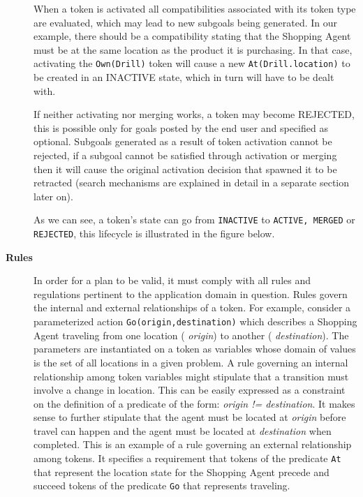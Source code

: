 \begin{description}
When a token is activated all compatibilities associated with its
token type are evaluated, which may lead to new subgoals being
generated. In our example, there should be a compatibility stating
that the Shopping Agent must be at the same location as the product it
is purchasing. In that case, activating the \texttt{Own(Drill)} token
will cause a new \texttt{At(Drill.location)} to be created in an
INACTIVE state, which in turn will have to be dealt with.


If neither activating nor merging works, a token may become REJECTED,
this is possible only for goals posted by the end user and specified
as optional. Subgoals generated as a result of token activation cannot
be rejected, if a subgoal cannot be satisfied through activation or
merging then it will cause the original activation decision that
spawned it to be retracted (\eus search mechanisms are explained in
detail in a separate section later on).

As we can see, a token's state can go from \texttt{INACTIVE} to
\texttt{ACTIVE, MERGED} or \texttt{REJECTED}, this lifecycle is
illustrated in the figure below.


\item[\textbf{Rules}] In order for a plan to be valid, it must comply
  with all rules and regulations pertinent to the application domain
  in question. Rules govern the internal and external relationships of
  a token. For example, consider a parameterized action
  \texttt{Go(origin,destination)} which describes a Shopping Agent
  traveling from one location ( \textit{origin}) to another (
  \textit{destination}). The parameters are instantiated on a token as
  variables whose domain of values is the set of all locations in a
  given problem. A rule governing an internal relationship among token
  variables might stipulate that a transition must involve a change in
  location. This can be easily expressed as a constraint on the
  definition of a predicate of the form: \textit{origin !=
    destination}. It makes sense to further stipulate that the agent
  must be located at \textit{origin} before travel can happen and the
  agent must be located at \textit{destination} when completed. This
  is an example of a rule governing an external relationship among
  tokens. It specifies a requirement that tokens of the predicate
  \texttt{At} that represent the location state for the Shopping Agent
  precede and succeed tokens of the predicate \texttt{Go} that
  represents traveling.


\end{description}
